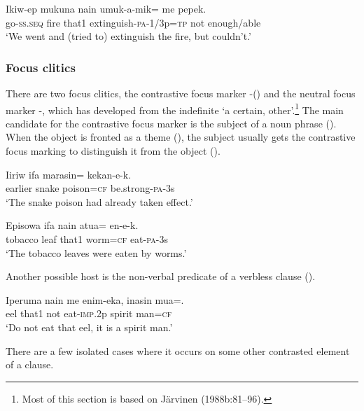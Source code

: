 \ea%
\label{ex:x1399}
\gll Ikiw-ep mukuna nain umuk-a-mik= me pepek. \\
go-\textsc{ss}.\textsc{seq} fire that1 extinguish-\textsc{pa}-1/3p=\textsc{tp} not enough/able\\
\glt`We went and (tried to) extinguish the fire, but couldn't.'
\z

\subsubsection[Focus clitics]{Focus clitics}
{}
There are two focus clitics, the contrastive focus marker -() and the neutral focus marker -, which has developed from the indefinite  `a certain, other'.\footnote{Most of this section is based on J\"arvinen (1988b:81--96).} The main candidate for the contrastive focus marker is the subject of a noun phrase (). When the object is fronted as a theme (), the subject usually gets the contrastive focus marking to distinguish it from the object (). 

\ea%
\label{ex:x781}
\gll Iiriw ifa marasin= kekan-e-k. \\
earlier snake poison=\textsc{cf} be.strong-\textsc{pa}-3s\\
\glt`The snake poison had already taken effect.'
\z

\ea%
\label{ex:x782}
\gll Episowa ifa nain atua= en-e-k. \\
tobacco leaf that1 worm=\textsc{cf} eat-\textsc{pa}-3s\\
\glt`The tobacco leaves were eaten by worms.'
\z

Another possible host is the non-verbal predicate of a verbless clause ().

\ea%
\label{ex:x783}
\gll Iperuma nain me enim-eka, inasin mua=. \\
eel that1 not eat-\textsc{imp}.2p spirit man=\textsc{cf}\\
\glt`Do not eat that eel, it is a spirit man.'
\z

There are a few isolated cases where it occurs on some other contrasted element of a clause.

